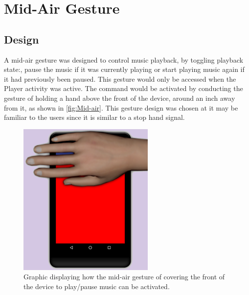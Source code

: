 \documentclass{l4proj}
\begin{document}
\section{Mid-Air Gesture}

\subsection{Design}
A mid-air gesture was designed to control music playback, by toggling playback state:, pause the music if it was currently playing or start playing music again if it had previously been paused. This gesture would only be accessed when the Player activity was active. The command would be activated by conducting the gesture of holding a hand above the front of the device, around an inch away from it, as shown in \autoref{fig:Mid-air}. This gesture design was chosen at it may be familiar to the users since it is similar to a stop hand signal.

\begin{figure}
    \centering
    \includegraphics[width=0.6\textwidth]{images/covering.png}
        \caption{Graphic displaying how the mid-air gesture of covering the front of the device to play/pause music can be activated.}
        \label{fig:Mid-air}
\end{figure}
\end{document}
